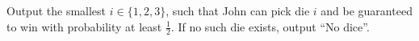 

Output the smallest $i \in \{1, 2, 3\}$, such that John can pick die
$i$ and be guaranteed to win with probability at least $\frac{1}{2}$.
If no such die exists, output ``No dice''.

